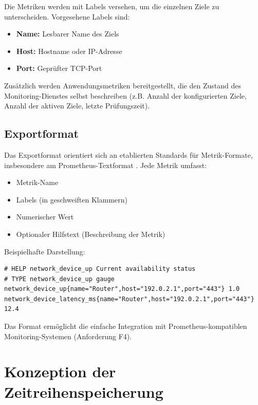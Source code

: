 Die Metriken werden mit Labels versehen, um die einzelnen Ziele zu unterscheiden. Vorgesehene Labels sind:

\begin{itemize}
    \item \textbf{Name:} Lesbarer Name des Ziels
    \item \textbf{Host:} Hostname oder IP-Adresse
    \item \textbf{Port:} Geprüfter TCP-Port
\end{itemize}

Zusätzlich werden Anwendungsmetriken bereitgestellt, die den Zustand des Monitoring-Dienstes selbst beschreiben (z.B. Anzahl der konfigurierten Ziele, Anzahl der aktiven Ziele, letzte Prüfungszeit).

\subsection{Exportformat}
\label{subsec:exportformat}

Das Exportformat orientiert sich an etablierten Standards für Metrik-Formate, insbesondere am Prometheus-Textformat \cite{prometheus-text-format}. Jede Metrik umfasst:

\begin{itemize}
    \item Metrik-Name
    \item Labels (in geschweiften Klammern)
    \item Numerischer Wert
    \item Optionaler Hilfstext (Beschreibung der Metrik)
\end{itemize}

Beispielhafte Darstellung:

\begin{lstlisting}[caption={Beispielhafte Darstellung einer Netzwerkmetrik},label={lst:metrikenbeispiel}]
# HELP network_device_up Current availability status
# TYPE network_device_up gauge
network_device_up{name="Router",host="192.0.2.1",port="443"} 1.0
network_device_latency_ms{name="Router",host="192.0.2.1",port="443"} 12.4
\end{lstlisting}

Das Format ermöglicht die einfache Integration mit Prometheus-kompatiblen Monitoring-Systemen (Anforderung F4).

\section{Konzeption der Zeitreihenspeicherung}
\label{sec:konzeption-zeitreihenspeicher}


